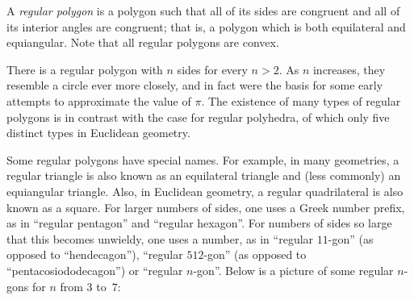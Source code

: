 \documentclass[12pt]{article}
\begin{document}

A \emph{regular polygon} is a polygon such that all of its sides are congruent and all of its interior angles are congruent; that is, a polygon which is both equilateral and equiangular.  Note that all regular polygons are convex.

There is a regular polygon with $n$ sides for every $n>2$.  As $n$ increases, they resemble a circle ever more closely, and in fact were the basis for some early attempts to approximate the value of $\pi$.  The existence of many types of regular polygons is in contrast with the case for regular polyhedra, of which only five distinct types in Euclidean geometry.

Some regular polygons have special names.  For example, in many geometries, a regular triangle is also known as an equilateral triangle and (less commonly) an equiangular triangle.  Also, in Euclidean geometry, a regular quadrilateral is also known as a square.  For larger numbers of sides, one uses a Greek number prefix, as in ``regular pentagon'' and ``regular hexagon''.  For numbers of sides so large that this becomes unwieldy, one uses a number, as in ``regular $11$-gon'' (as opposed to ``hendecagon''), ``regular $512$-gon'' (as opposed to ``pentacosiododecagon'') or ``regular $n$-gon''. Below is a picture of some regular $n$-gons for $n$ from $3$ to~$7$:
\end{document}
